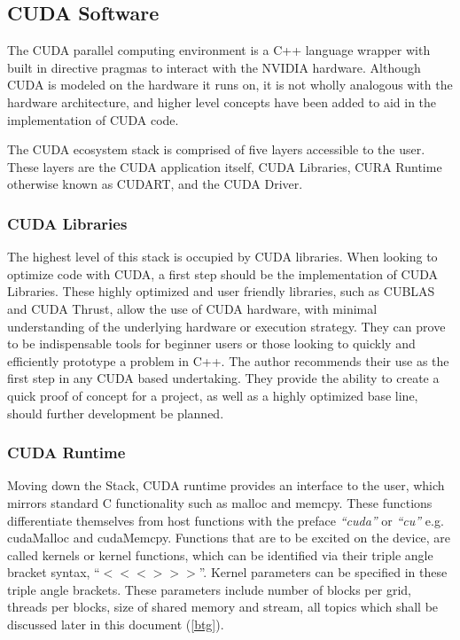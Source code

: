 \subsection{CUDA Software}

The CUDA parallel computing environment is a C++ language wrapper with built in
\gls{directive pragmas} to interact with the NVIDIA hardware.  Although CUDA is modeled on the
hardware it runs on, it is not wholly analogous with the hardware architecture,
and higher level concepts have been added to aid in the implementation of CUDA code.
\par
The CUDA ecosystem stack is comprised of five layers accessible to the user.
These layers are the CUDA application itself, CUDA Libraries, CURA Runtime otherwise
known as CUDART, and the CUDA Driver.


\subsubsection{CUDA Libraries}

The highest level of this stack is occupied
by CUDA libraries. When looking to optimize code with CUDA, a
first step should be the implementation of CUDA Libraries.  These highly optimized
and user friendly libraries, such as CUBLAS and CUDA Thrust, allow the use of
CUDA hardware, with minimal understanding of the underlying hardware or execution strategy.
They can prove to be indispensable tools for beginner users or those looking to quickly and
efficiently prototype a problem in C++. The author recommends their use as the first step
in any CUDA based undertaking. They provide the ability to create a quick proof
of concept for a project, as well as a highly optimized base line, should further
development be planned.
\subsubsection{CUDA Runtime}

Moving down the Stack, CUDA runtime provides an interface to the user, which mirrors
standard C functionality such as malloc and memcpy.  These functions differentiate
themselves from host functions with the preface \textit{``cuda''} or \textit{``cu''}
e.g. cudaMalloc and cudaMemcpy.  Functions that are to be excited on the
device, are called kernels or kernel functions, which can be identified
 via their triple angle bracket syntax, ``$<<< >>>$''.
Kernel parameters can be specified in these triple angle brackets.  These parameters
include number of blocks per grid, threads per blocks, size of shared memory and
stream, all topics which shall be discussed later in this document (\ref{btg}).

